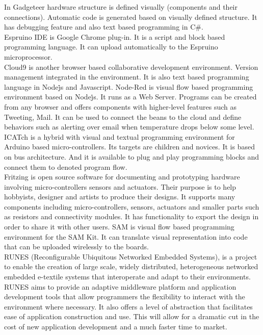 In Gadgeteer hardware structure is defined visually (components and their connections). Automatic code is generated based on visually defined structure. It has debugging feature and also text based programming in C\#.  \\

Espruino IDE is Google Chrome plug-in. It is a script and block based programming language. It can upload automatically to the Espruino microprocessor. \\

Cloud9 is another browser based collaborative development environment. Version management integrated in the environment. It is also text based programming language in Node\.js and Javascript. Node-Red is visual flow based programming environment based on Node\.js. It runs as a Web Server. Programs can be created from any browser and offers components with higher-level features such as Tweeting, Mail. It can be used to connect the beans to the cloud and define behaviors such as alerting over email when temperature drops below some level. \\

I\*CATch is a hybrid with visual and textual programming environment for Arduino based micro-controllers. Its targets are children and novices. It is based on bus architecture. And it is available to plug and play programming blocks and connect them to denoted program flow.  \\

Fritzing is open source software for documenting and prototyping hardware involving micro-controllers sensors and actuators. Their purpose is to help hobbyists, designer and artists to produce their designs. It supports many components including micro-controllers, sensors, actuators and smaller parts such as resistors and connectivity modules. It has functionality to export the design in order to share it with other users. SAM is visual flow based programming environment for the SAM Kit. It can translate visual representation into code that can be uploaded wirelessly to the boards. \\

RUNES (Reconfigurable Ubiquitous Networked Embedded Systems), is a project to enable the creation of large scale, widely distributed, heterogeneous networked embedded e-textile systems that interoperate and adapt to their environments. RUNES aims to provide an adaptive middleware platform and application development tools that allow programmers the flexibility to interact with the environment where necessary. It also offers a level of abstraction that facilitates ease of application construction and use. This will allow for a dramatic cut in the cost of new application development and a much faster time to market. \\

